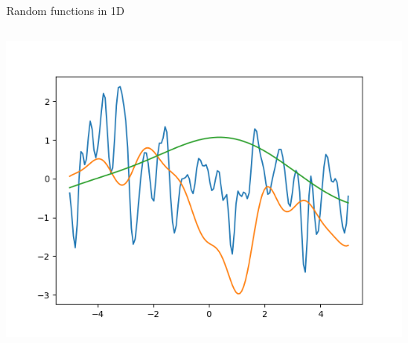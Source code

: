 \documentclass[presentation]{beamer}
\begin{document}
\begin{frame}[fragile,label={sec:org3d3c0f4}]{Random functions in 1D}
\begin{columns}
\begin{column}{0.4\columnwidth}
\begin{center}
\includegraphics[width=.9\linewidth]{images/fig08.png}
\end{center}
\end{column}
\end{columns}
\end{frame}
\end{document}
